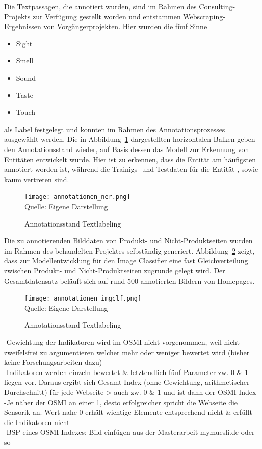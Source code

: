 Die Textpassagen, die annotiert wurden, sind im Rahmen des Consulting-Projekts zur Verfügung gestellt worden und entstammen
Webscraping-Ergebnissen von Vorgängerprojekten.
Hier wurden die fünf Sinne
\begin{itemize}
	\item Sight
	\item Smell
	\item Sound
	\item Taste
	\item Touch
\end{itemize}
als Label festgelegt und konnten im Rahmen des Annotationsprozesses ausgewählt werden.
Die in Abbildung~\ref{fig:annotation_ner} dargestellten horizontalen Balken geben den Annotationsstand wieder, auf Basis dessen
das Modell zur Erkennung von Entitäten entwickelt wurde.
Hier ist zu erkennen, dass die Entität \grqq am häufigsten annotiert worden ist, während die Trainigs- und Testdaten für
die Entität \grqq, \grqq sowie \grqq kaum vertreten sind.
\begin{figure}[H]
	\caption{Annotationsstand Textlabeling}\label{fig:annotation_ner}
	\texttt{[image: annotationen\_ner.png]}
	\\
	Quelle: Eigene Darstellung
\end{figure}
Die zu annotierenden Bilddaten von Produkt- und Nicht-Produktseiten wurden im Rahmen des behandelten Projektes selbständig
generiert.
Abbildung~\ref{fig:annotation_imgclf} zeigt, dass zur Modellentwicklung für den Image Classifier eine fast Gleichverteilung zwischen Produkt-
und Nicht-Produktseiten zugrunde gelegt wird.
Der Gesamtdatensatz beläuft sich auf rund 500 annotierten Bildern von Homepages.
\begin{figure}[H]
	\caption{Annotationsstand Textlabeling}\label{fig:annotation_imgclf}
	\texttt{[image: annotationen\_imgclf.png]}
	\\
	Quelle: Eigene Darstellung
\end{figure}

-Gewichtung der Indikatoren wird im \ac{OSMI} nicht vorgenommen, weil nicht zweifelsfrei zu
argumentieren welcher mehr oder weniger bewertet wird (bisher keine Forschungsarbeiten
dazu) \\
-Indikatoren werden einzeln bewertet \& letztendlich fünf Parameter zw. 0 \& 1 liegen vor.
Daraus ergibt sich Gesamt-Index (ohne Gewichtung, arithmetischer Durchschnitt) für jede
Webseite > auch zw. 0 \& 1 und ist dann der \ac{OSMI}-Index \\
-Je näher der \ac{OSMI} an einer 1, desto erfolgreicher spricht die Webseite die Sensorik an. Wert
nahe 0 erhält wichtige Elemente entsprechend nicht \& erfüllt die Indikatoren nicht \\
-BSP eines \ac{OSMI}-Indexes: Bild einfügen aus der Masterarbeit mymuesli.de oder so



